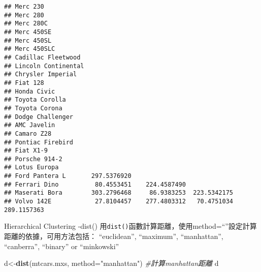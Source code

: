 \documentclass[]{book}
\newenvironment{Shaded}{\begin{snugshade}}{\end{snugshade}}
\newcommand{\KeywordTok}[1]{\textcolor[rgb]{0.13,0.29,0.53}{\textbf{{#1}}}}
\newcommand{\DataTypeTok}[1]{\textcolor[rgb]{0.13,0.29,0.53}{{#1}}}
\newcommand{\StringTok}[1]{\textcolor[rgb]{0.31,0.60,0.02}{{#1}}}
\newcommand{\CommentTok}[1]{\textcolor[rgb]{0.56,0.35,0.01}{\textit{{#1}}}}
\newcommand{\NormalTok}[1]{{#1}}
\begin{document}
\begin{verbatim}
## Merc 230                                                                  
## Merc 280                                                                  
## Merc 280C                                                                 
## Merc 450SE                                                                
## Merc 450SL                                                                
## Merc 450SLC                                                               
## Cadillac Fleetwood                                                        
## Lincoln Continental                                                       
## Chrysler Imperial                                                         
## Fiat 128                                                                  
## Honda Civic                                                               
## Toyota Corolla                                                            
## Toyota Corona                                                             
## Dodge Challenger                                                          
## AMC Javelin                                                               
## Camaro Z28                                                                
## Pontiac Firebird                                                          
## Fiat X1-9                                                                 
## Porsche 914-2                                                             
## Lotus Europa                                                              
## Ford Pantera L       297.5376920                                          
## Ferrari Dino          80.4553451    224.4587490                           
## Maserati Bora        303.2796468     86.9383253  223.5342175              
## Volvo 142E            27.8104457    277.4803312   70.4751034   289.1157363
\end{verbatim}

Hierarchical Clustering -dist()
用\texttt{dist()}函數計算距離，使用method=``''設定計算距離的依據，可用方法包括：
``euclidean'', ``maximum'', ``manhattan'', ``canberra'', ``binary'' or
``minkowski''

\begin{Shaded}
\begin{Highlighting}[]
\NormalTok{d<-}\KeywordTok{dist}\NormalTok{(mtcars.mxs, }\DataTypeTok{method=}\StringTok{"manhattan"}\NormalTok{) }\CommentTok{#計算manhattan距離}
\NormalTok{d}
\end{Highlighting}
\end{Shaded}
\end{document}
